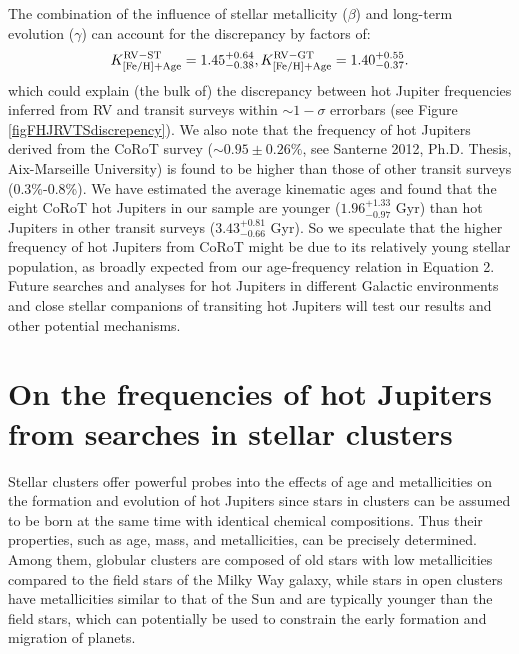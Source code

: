 \documentclass[twocolumn]{pnas-new}
\begin{document}
The combination of the influence of stellar metallicity ($\beta$) and long-term evolution ($\gamma$) can account for the discrepancy by factors of:
\begin{equation}
  K^{\rm RV-ST}_{\rm [Fe/H]+Age} = 1.45^{+0.64}_{-0.38}, 
  K^{\rm RV-GT}_{\rm [Fe/H]+Age} = 1.40^{+0.55}_{-0.37}.
\end{equation}
which could explain (the bulk of) the discrepancy between hot Jupiter frequencies inferred from RV and transit surveys within $\sim 1-\sigma$ errorbars (see Figure \ref{figFHJRVTSdiscrepency}).
{We also note that the frequency of hot Jupiters derived from the CoRoT survey ($\sim 0.95 \pm 0.26\%$, see Santerne 2012, Ph.D. Thesis, Aix-Marseille University) is found to be higher than those of other transit surveys (0.3\%-0.8\%). 
We have estimated the average kinematic ages and found that the eight CoRoT hot Jupiters in our sample are younger ($1.96^{+1.33}_{-0.97}$ Gyr) than hot Jupiters in other transit surveys ($3.43^{+0.81}_{-0.66}$ Gyr). So we speculate that the higher frequency of hot Jupiters from  CoRoT might be due to its relatively young stellar population, as broadly expected from our age-frequency relation in Equation 2.}
Future searches and analyses for hot Jupiters in different Galactic environments and close stellar companions of transiting hot Jupiters will test our results and other potential mechanisms.


\section{On the frequencies of hot Jupiters from searches in stellar clusters}
\label{sec.HJ.globularcluster}
Stellar clusters offer powerful probes into the effects of age and metallicities on the formation and evolution of hot Jupiters since stars in clusters can be assumed to be born at the same time with identical chemical compositions. Thus their properties, such as age, mass, and metallicities, can be precisely determined.
Among them, globular clusters are composed of old stars with low metallicities compared to the field stars of the Milky Way galaxy, while stars in open clusters have metallicities similar to that of the Sun and are typically younger than the field stars, which can potentially be used to constrain the early formation and migration of planets.
\end{document}
